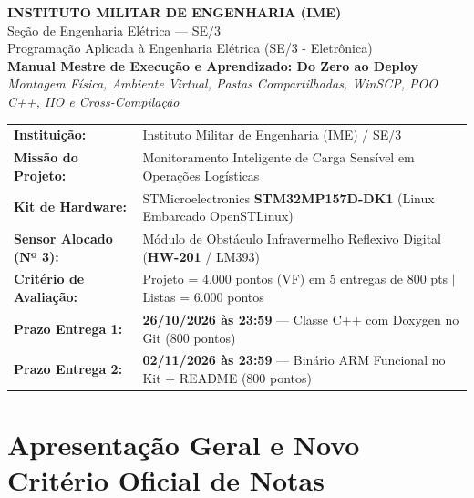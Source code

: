 \documentclass[11pt,a4paper]{article}
\begin{document}
\begin{center}
    {\Large \textbf{INSTITUTO MILITAR DE ENGENHARIA (IME)}}\\[0.15cm]
    {\large Seção de Engenharia Elétrica --- SE/3}\\[0.1cm]
    {\normalsize Programação Aplicada à Engenharia Elétrica (SE/3 - Eletrônica)}\\[0.25cm]
    {\Large \textbf{Manual Mestre de Execução e Aprendizado: Do Zero ao Deploy}}\\[0.1cm]
    {\normalsize \textit{Montagem Física, Ambiente Virtual, Pastas Compartilhadas, WinSCP, POO C++, IIO e Cross-Compilação}}\\[0.35cm]
    \begin{tabular}{lp{11.0cm}}
        \toprule
        \textbf{Instituição:} & Instituto Militar de Engenharia (IME) / SE/3 \\
        \textbf{Missão do Projeto:} & Monitoramento Inteligente de Carga Sensível em Operações Logísticas \\
        \textbf{Kit de Hardware:} & STMicroelectronics \textbf{STM32MP157D-DK1} (Linux Embarcado OpenSTLinux) \\
        \textbf{Sensor Alocado (Nº 3):} & Módulo de Obstáculo Infravermelho Reflexivo Digital (\textbf{HW-201} / LM393) \\
        \textbf{Critério de Avaliação:} & Projeto = 4.000 pontos (VF) em 5 entregas de 800 pts $|$ Listas = 6.000 pontos \\
        \textbf{Prazo Entrega 1:} & \textbf{26/10/2026 às 23:59} --- Classe C++ com Doxygen no Git (800 pontos) \\
        \textbf{Prazo Entrega 2:} & \textbf{02/11/2026 às 23:59} --- Binário ARM Funcional no Kit + README (800 pontos) \\
        \bottomrule
    \end{tabular}
\end{center}

\vspace{0.2cm}

\section{Apresentação Geral e Novo Critério Oficial de Notas}
\end{document}
